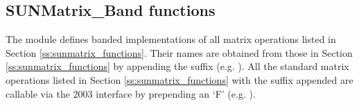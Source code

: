 \subsection{SUNMatrix\_Band functions}
\label{ss:sunmat_band_functions}

The {\sunmatband} module defines banded implementations of all matrix
operations listed in Section \ref{ss:sunmatrix_functions}. Their names are obtained
from those in Section \ref{ss:sunmatrix_functions} by appending the
suffix  (e.g. ).
All the standard matrix operations listed in Section \ref{ss:sunmatrix_functions} with the suffix
 appended are callable via the {\F} 2003 interface by prepending an
`F' (e.g. ).

